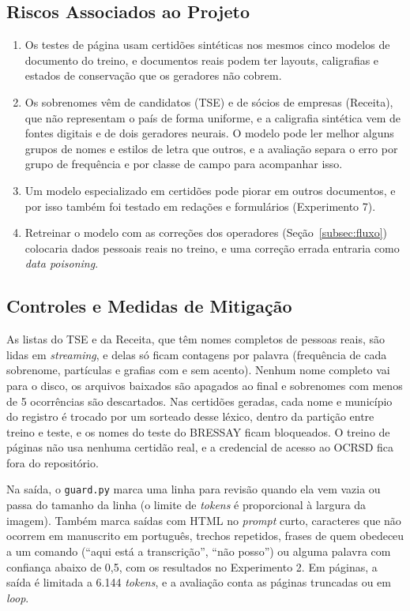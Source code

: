 \subsection{Riscos Associados ao Projeto}

\begin{enumerate}
    \item Os testes de página usam certidões sintéticas nos mesmos cinco modelos de documento do treino, e documentos reais podem ter layouts, caligrafias e estados de conservação que os geradores não cobrem.
    \item Os sobrenomes vêm de candidatos (TSE) e de sócios de empresas (Receita), que não representam o país de forma uniforme, e a caligrafia sintética vem de fontes digitais e de dois geradores neurais. O modelo pode ler melhor alguns grupos de nomes e estilos de letra que outros, e a avaliação separa o erro por grupo de frequência e por classe de campo para acompanhar isso.
    \item Um modelo especializado em certidões pode piorar em outros documentos, e por isso também foi testado em redações e formulários (Experimento 7).
    \item Retreinar o modelo com as correções dos operadores (Seção~\ref{subsec:fluxo}) colocaria dados pessoais reais no treino, e uma correção errada entraria como \emph{data poisoning}.
\end{enumerate}

\subsection{Controles e Medidas de Mitigação}
\label{subsec:controles}

As listas do TSE e da Receita, que têm nomes completos de pessoas reais, são lidas em \emph{streaming}, e delas só ficam contagens por palavra (frequência de cada sobrenome, partículas e grafias com e sem acento). Nenhum nome completo vai para o disco, os arquivos baixados são apagados ao final e sobrenomes com menos de 5 ocorrências são descartados. Nas certidões geradas, cada nome e município do registro é trocado por um sorteado desse léxico, dentro da partição entre treino e teste, e os nomes do teste do BRESSAY ficam bloqueados. O treino de páginas não usa nenhuma certidão real, e a credencial de acesso ao OCRSD fica fora do repositório.

Na saída, o \texttt{guard.py} marca uma linha para revisão quando ela vem vazia ou passa do tamanho da linha (o limite de \emph{tokens} é proporcional à largura da imagem). Também marca saídas com HTML no \emph{prompt} curto, caracteres que não ocorrem em manuscrito em português, trechos repetidos, frases de quem obedeceu a um comando (``aqui está a transcrição'', ``não posso'') ou alguma palavra com confiança abaixo de 0,5, com os resultados no Experimento 2. Em páginas, a saída é limitada a 6.144 \emph{tokens}, e a avaliação conta as páginas truncadas ou em \emph{loop}.

